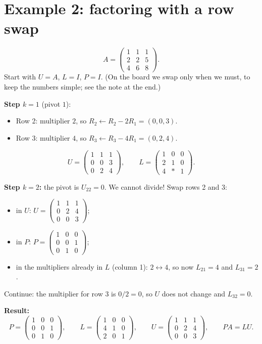 \section{Example 2: factoring with a row swap}

\[ A=\begin{pmatrix}1&1&1\\2&2&5\\4&6&8\end{pmatrix}. \]
Start with $U=A$, $L=I$, $P=I$. (On the board we swap only when we must, to keep the numbers simple; see the note at the end.)

\textbf{Step $k=1$} (pivot $1$):
\begin{itemize}
  \item Row 2: multiplier $2$, so $R_2\leftarrow R_2-2R_1=(0,0,3)$.
  \item Row 3: multiplier $4$, so $R_3\leftarrow R_3-4R_1=(0,2,4)$.
\end{itemize}
\[ U=\begin{pmatrix}1&1&1\\0&0&3\\0&2&4\end{pmatrix},\qquad L=\begin{pmatrix}1&0&0\\2&1&0\\4&*&1\end{pmatrix}. \]

\textbf{Step $k=2$:} the pivot is $U_{22}=0$. We cannot divide! Swap rows 2 and 3:
\begin{itemize}
  \item in $U$: $U=\begin{pmatrix}1&1&1\\0&2&4\\0&0&3\end{pmatrix}$;
  \item in $P$: $P=\begin{pmatrix}1&0&0\\0&0&1\\0&1&0\end{pmatrix}$;
  \item in the multipliers already in $L$ (column 1): $2\leftrightarrow4$, so now $L_{21}=4$ and $L_{31}=2$.
\end{itemize}
Continue: the multiplier for row 3 is $0/2=0$, so $U$ does not change and $L_{32}=0$.

\textbf{Result:}
\[ P=\begin{pmatrix}1&0&0\\0&0&1\\0&1&0\end{pmatrix},\qquad L=\begin{pmatrix}1&0&0\\4&1&0\\2&0&1\end{pmatrix},\qquad U=\begin{pmatrix}1&1&1\\0&2&4\\0&0&3\end{pmatrix},\qquad PA=LU. \]

